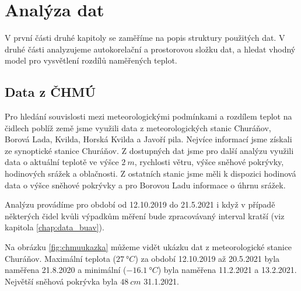 \chapter{Analýza dat} \label{chap:analysis}
V první části druhé kapitoly se zaměříme na popis struktury použitých dat. V druhé části analyzujeme autokorelační a prostorovou složku dat, a hledat vhodný model pro vysvětlení rozdílů naměřených teplot.

\section{Data z ČHMÚ}
Pro hledání souvislosti mezi meteorologickými podmínkami a rozdílem teplot na čidlech poblíž země jsme využili data z meteorologických stanic Churáňov, Borová Lada, Kvilda, Horská Kvilda a Javoří pila. Nejvíce informací jsme získali ze synoptické stanice Churáňov. Z dostupných dat jsme pro další analýzu využili data o aktuální teplotě ve výšce $\SI{2}{m}$, rychlosti větru, výšce sněhové pokrývky, hodinových srážek a oblačnosti. Z ostatních stanic jsme měli k dispozici hodinová data o výšce sněhové pokrývky a pro Borovou Ladu informace o úhrnu srážek.

Analýzu provádíme pro období od 12.10.2019 do 21.5.2021 i když v případě některých čidel kvůli výpadkům měření bude zpracovávaný interval kratší (viz kapitola \ref{chap:data_buav}).

Na obrázku \ref{fig:chmuukazka} můžeme vidět ukázku dat z meteorologické stanice Churáňov. Maximální teplota ($\SI{27}{\degree C}$) za období 12.10.2019 až 20.5.2021 byla naměřena 21.8.2020 a minimální ($\SI{-16.1}{\degree C}$) byla naměřena 11.2.2021 a 13.2.2021. Největší sněhová pokrývka byla $\SI{48}{cm}$ 31.1.2021.


